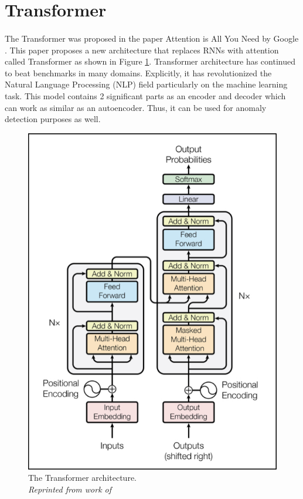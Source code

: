\section{Transformer}
\paragraph{}
The Transformer was proposed in the paper Attention is All You Need by Google \cite{vaswani_shazeer_parmar_uszkoreit_jones_n_gomez_kaiser_polosukhin_2017}. This paper proposes a new architecture that replaces RNNs with attention called Transformer as shown in Figure \ref{fig:attention}. Transformer architecture has continued to beat benchmarks in many domains. Explicitly, it has revolutionized the Natural Language Processing (NLP) field particularly on the machine learning task. This model contains 2 significant parts as an encoder and decoder which can work as similar as an autoencoder. Thus, it can be used for anomaly detection purposes as well.

\begin{figure}[H]
  \centering
  \caption[The Transformer architecture.]{The Transformer architecture. \\\hspace{\textwidth} \emph{Reprinted from work of \citeauthor{vaswani_shazeer_parmar_uszkoreit_jones_n_gomez_kaiser_polosukhin_2017} \citeyear{vaswani_shazeer_parmar_uszkoreit_jones_n_gomez_kaiser_polosukhin_2017}}}\label{fig:attention}
  \includegraphics[scale = 0.4
  ]{figures/attention.jpg}  
\end{figure}

